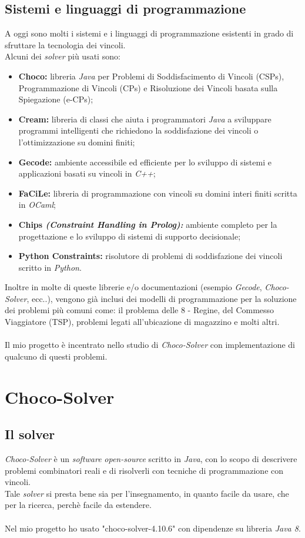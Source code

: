 \subsection{Sistemi e linguaggi di programmazione}
A oggi sono molti i sistemi e i linguaggi di programmazione esistenti in grado di sfruttare la tecnologia dei vincoli. \\
Alcuni dei \textit{solver} pi\`u usati sono:
\begin{itemize}
\item \textbf{Choco:} libreria \textit{Java} per Problemi di Soddisfacimento di Vincoli (CSPs), Programmazione di Vincoli (CPs) e Risoluzione dei Vincoli basata sulla Spiegazione (e-CPs);
\item \textbf{Cream:}  libreria di classi che aiuta i programmatori \textit{Java} a sviluppare programmi intelligenti che richiedono la soddisfazione dei vincoli o l'ottimizzazione su domini finiti;
\item \textbf{Gecode:} ambiente accessibile ed efficiente per lo sviluppo di sistemi e applicazioni basati su vincoli in \textit{C++};
\item \textbf{FaCiLe:} libreria di programmazione con vincoli su domini interi finiti scritta in \textit{OCaml};
\item \textbf{Chips \textit{(Constraint Handling in Prolog):}}
ambiente completo per la progettazione e lo sviluppo di sistemi di supporto decisionale;
\item \textbf{Python Constraints:} risolutore di problemi di soddisfazione dei vincoli scritto in \textit{Python}.
\end{itemize}
\noindent
Inoltre in molte di queste librerie e/o documentazioni (esempio \textit{Gecode}, \textit{Choco-Solver}, ecc..), vengono gi\`a inclusi dei modelli di programmazione per la soluzione dei problemi pi\`u comuni come: il problema delle 8 - Regine, del Commesso Viaggiatore (TSP), problemi legati all'ubicazione di magazzino e molti altri.\\\\
\noindent
Il mio progetto \`e incentrato nello studio di \textit{Choco-Solver} con implementazione di qualcuno di questi problemi.

\newpage
\section{Choco-Solver}

\subsection{Il solver}
\textit{Choco-Solver} \`e un \textit{software} \textit{open-source} scritto in \textit{Java}, con lo scopo di descrivere problemi combinatori reali e di risolverli con tecniche di programmazione con vincoli.\\
\noindent
Tale \textit{solver} si presta bene sia per l'insegnamento, in quanto facile da usare, che per la ricerca, perch\`e facile da estendere.\\\\
\noindent
Nel mio progetto ho usato "choco-solver-4.10.6" con dipendenze su libreria \textit{Java 8}.

